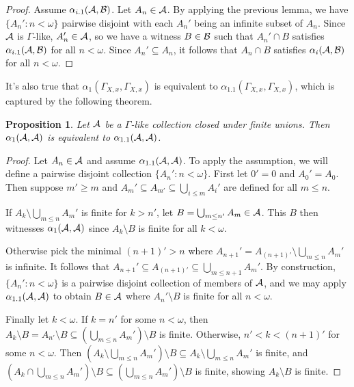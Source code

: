 \documentclass{amsart}
\theoremstyle{plain}
\newtheorem{proposition}[theorem]{Proposition}
\theoremstyle{definition}
\theoremstyle{remark}
\theoremstyle{plain}
\theoremstyle{definition}
\theoremstyle{remark}
\begin{document}
\begin{proof}
Assume \(\alpha_{i.1}(\mathcal{A},\mathcal{B})\).
Let \(A_n\in\mathcal{A}\). By applying the previous lemma, we have
\(\{A_n':n<\omega\}\) pairwise disjoint with each \(A_n'\) being
an infinite subset of \(A_n\). Since \(\mathcal{A}\) is \(\Gamma\)-like,
\(A_n'\in\mathcal{A}\), so we have a witness \(B\in\mathcal{B}\) such that
\(A_n'\cap B\) satisfies \(\alpha_{i.1}(\mathcal{A},\mathcal{B})\) for all \(n<\omega\).
Since \(A_n'\subseteq A_n\), it follows that \(A_n\cap B\) satisfies
\(\alpha_{i}(\mathcal{A},\mathcal{B})\) for all \(n<\omega\).
\end{proof}

It's also true that \(\alpha_1(\Gamma_{X,x},\Gamma_{X,x})\)
is equivalent to \(\alpha_{1.1}(\Gamma_{X,x},\Gamma_{X,x})\),
which is captured by the following theorem.

\begin{proposition}
Let \(\mathcal{A}\) be a \(\Gamma\)-like collection closed under finite unions.
Then \(\alpha_1(\mathcal{A},\mathcal{A})\) is equivalent to
\(\alpha_{1.1}(\mathcal{A},\mathcal{A})\).
\end{proposition}

\begin{proof}
Let \(A_n\in\mathcal{A}\) and assume \(\alpha_{1.1}(\mathcal{A},\mathcal{A})\).
To apply the assumption, we will define a pairwise disjoint
collection \(\{A_n':n<\omega\}\). First let \(0'=0\) and \(A_0'=A_0\).
Then suppose \(m'\geq m\) and \(A_m'\subseteq A_{m'}\subseteq\bigcup_{i\leq m}A_i'\) 
are defined for all \(m\leq n\).

If \(A_k\setminus\bigcup_{m\leq n}A_m'\) is finite for \(k>n'\), let
\(B=\bigcup_{m\leq n'}A_m\in\mathcal{A}\). This \(B\) then witnesses 
\(\alpha_1(\mathcal{A},\mathcal{A})\) since \(A_k\setminus B\) is finite for all \(k<\omega\).

Otherwise pick the minimal \((n+1)'>n\) where 
\(A_{n+1}'=A_{(n+1)'}\setminus\bigcup_{m\leq n}A_m'\) is infinite.
It follows that \(A_{n+1}'\subseteq A_{(n+1)'}\subseteq \bigcup_{m\leq n+1}A_m'\).
By construction, \(\{A_n':n<\omega\}\) is a pairwise disjoint collection of
members of \(\mathcal{A}\), and we may
apply \(\alpha_{1.1}(\mathcal{A},\mathcal{A})\) to obtain \(B\in\mathcal{A}\) where
\(A_n'\setminus B\) is finite for all \(n<\omega\).

Finally let \(k<\omega\). If \(k=n'\) for some \(n<\omega\), then 
\(A_k\setminus B=A_{n'}\setminus B\subseteq (\bigcup_{m\leq n}A_m')\setminus B\) 
is finite.
Otherwise, \(n'<k<(n+1)'\) for some \(n<\omega\).
Then 
\((A_k\setminus\bigcup_{m\leq n}A_m')\setminus B\subseteq A_k\setminus\bigcup_{m\leq n}A_m'\)
is finite, and 
\((A_k\cap\bigcup_{m\leq n}A_m')\setminus B\subseteq(\bigcup_{m\leq n}A_m')\setminus B\)
is finite, showing \(A_k\setminus B\) is finite.
\end{proof}
\end{document}
